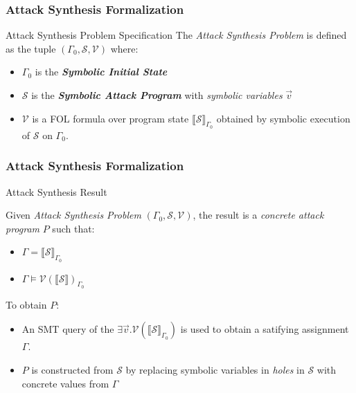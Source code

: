 \documentclass{beamer}
\newcommand{\boldIt}[1]{\textbf{\textit{#1}}}
\newcommand{\vect}[1]{\overrightarrow{#1}}
\begin{document}
\begin{frame}[fragile]
  \frametitle{Attack Synthesis Formalization}
  \begin{block}{Attack Synthesis Problem Specification}
      The \textit{Attack Synthesis Problem} is defined as the
      tuple $(\Gamma_0, \mathcal{S}, \mathcal{V})$ where:
      \begin{itemize}
          \item $\Gamma_0$ is the \boldIt{Symbolic Initial State}
          \item $\mathcal{S}$ is the \boldIt{Symbolic Attack Program}
            with \textit{symbolic variables} $\vect{v}$
          \item $\mathcal{V}$ is a FOL formula over program state
            $\llbracket \mathcal{S} \rrbracket_{\Gamma_0}$ obtained
            by symbolic execution of $\mathcal{S}$ on $\Gamma_0$.
      \end{itemize}
  \end{block}
\end{frame}

\begin{frame}
  \frametitle{Attack Synthesis Formalization}

  \begin{block}{Attack Synthesis Result}

    Given \textit{Attack Synthesis Problem} $(\Gamma_0, \mathcal{S}, \mathcal{V})$,
    the result is a \textit{concrete attack program} $P$ such that:
    \begin{itemize}
      \item $\Gamma = \llbracket \mathcal{S} \rrbracket_{\Gamma_0}$
      \item $\Gamma \vDash \mathcal{V}(\llbracket \mathcal{S} \rrbracket)_{\Gamma_0}$
    \end{itemize}
  \end{block}
   \pause
    To obtain $P$:
    \begin{itemize}
      \item An SMT query of the $ \exists \vect{v} .
          \mathcal{V}(\llbracket \mathcal{S} \rrbracket_{\Gamma_0})$
          is used to obtain a satifying assignment $\Gamma$.
        \item $P$ is constructed from $\mathcal{S}$ by replacing
          symbolic variables in \textit{holes} in $\mathcal{S}$
          with concrete values from $\Gamma$
    \end{itemize}
\end{frame}
\end{document}
